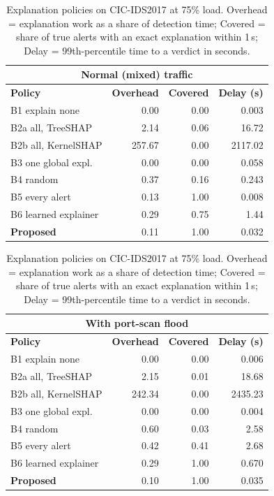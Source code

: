 \begin{table}[!htbp]
\centering
\caption{Explanation policies on CIC-IDS2017 at 75\% load. Overhead = explanation work as a share of detection time; Covered = share of true alerts with an exact explanation within 1\,s; Delay = 99th-percentile time to a verdict in seconds.}
\label{tab:stream}
\scriptsize
\setlength{\tabcolsep}{4pt}
\begin{minipage}[t]{0.495\textwidth}
\centering
\begin{tabular}{lrrr}
\toprule
\multicolumn{4}{c}{\textbf{Normal (mixed) traffic}} \\
\midrule
\textbf{Policy} & \textbf{Overhead} & \textbf{Covered} & \textbf{Delay (s)} \\
\midrule
B1 explain none & 0.00 & 0.00 & 0.003 \\
B2a all, TreeSHAP & 2.14 & 0.06 & 16.72 \\
B2b all, KernelSHAP & 257.67 & 0.00 & 2117.02 \\
B3 one global expl. & 0.00 & 0.00 & 0.058 \\
B4 random & 0.37 & 0.16 & 0.243 \\
B5 every alert & 0.13 & 1.00 & 0.008 \\
B6 learned explainer & 0.29 & 0.75 & 1.44 \\
\textbf{Proposed} & 0.11 & 1.00 & 0.032 \\
\bottomrule
\end{tabular}
\end{minipage}
\hfill
\begin{minipage}[t]{0.495\textwidth}
\centering
\begin{tabular}{lrrr}
\toprule
\multicolumn{4}{c}{\textbf{With port-scan flood}} \\
\midrule
\textbf{Policy} & \textbf{Overhead} & \textbf{Covered} & \textbf{Delay (s)} \\
\midrule
B1 explain none & 0.00 & 0.00 & 0.006 \\
B2a all, TreeSHAP & 2.15 & 0.01 & 18.68 \\
B2b all, KernelSHAP & 242.34 & 0.00 & 2435.23 \\
B3 one global expl. & 0.00 & 0.00 & 0.004 \\
B4 random & 0.60 & 0.03 & 2.58 \\
B5 every alert & 0.42 & 0.41 & 2.68 \\
B6 learned explainer & 0.29 & 1.00 & 0.670 \\
\textbf{Proposed} & 0.10 & 1.00 & 0.035 \\
\bottomrule
\end{tabular}
\end{minipage}
\end{table}
